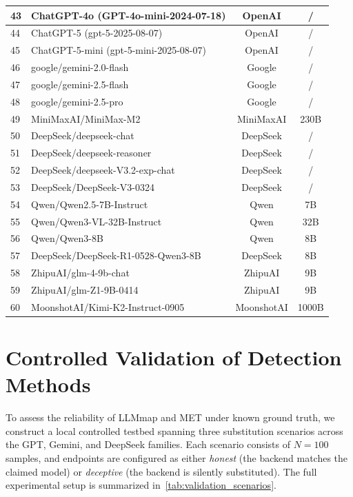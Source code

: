 \documentclass[letterpaper,twocolumn,10pt]{article}
\begin{document}
\begin{table}[t]
{\begin{tabular}{llcc}
43 & ChatGPT-4o (GPT-4o-mini-2024-07-18) & OpenAI & / \\\hline
44 & ChatGPT-5 (gpt-5-2025-08-07) & OpenAI & / \\\hline
45 & ChatGPT-5-mini (gpt-5-mini-2025-08-07) & OpenAI & / \\\hline
46 & google/gemini-2.0-flash & Google & / \\\hline
47 & google/gemini-2.5-flash & Google & / \\\hline
48 & google/gemini-2.5-pro & Google & / \\\hline
49 & MiniMaxAI/MiniMax-M2 & MiniMaxAI & 230B \\\hline
50 & DeepSeek/deepseek-chat & DeepSeek & / \\\hline
51 & DeepSeek/deepseek-reasoner & DeepSeek & / \\\hline
52 & DeepSeek/deepseek-V3.2-exp-chat & DeepSeek & / \\\hline
53 & DeepSeek/DeepSeek-V3-0324 & DeepSeek & / \\\hline
54 & Qwen/Qwen2.5-7B-Instruct & Qwen & 7B \\\hline
55 & Qwen/Qwen3-VL-32B-Instruct & Qwen & 32B \\\hline
56 & Qwen/Qwen3-8B & Qwen & 8B \\\hline
57 & DeepSeek/DeepSeek-R1-0528-Qwen3-8B & DeepSeek & 8B \\\hline
58 & ZhipuAI/glm-4-9b-chat & ZhipuAI & 9B \\\hline
59 & ZhipuAI/glm-Z1-9B-0414 & ZhipuAI & 9B \\\hline
60 & MoonshotAI/Kimi-K2-Instruct-0905 & MoonshotAI & 1000B \\

\bottomrule
\end{tabular}
}
\label{table: models}
\end{table}

\section{Controlled Validation of Detection Methods}
\label{appendix:validation}

To assess the reliability of LLMmap and MET under known ground truth, we construct a local controlled testbed spanning three substitution scenarios across the GPT, Gemini, and DeepSeek families.
Each scenario consists of $N{=}100$ samples, and endpoints are configured as either \emph{honest} (the backend matches the claimed model) or \emph{deceptive} (the backend is silently substituted).
The full experimental setup is summarized in~\autoref{tab:validation_scenarios}.
\end{document}
